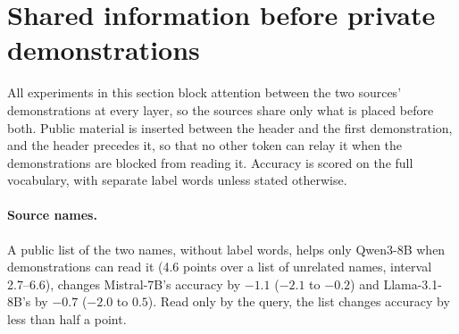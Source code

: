 \begin{table}[t]
\centering\small
\setlength{\tabcolsep}{3pt}
\caption{Controlled two-aspect reviews (shared words, both sources read by the query). With A-only reading added, accuracies are 73.8, 72.0, 86.8 and 83.3\% for selective blocking and 70.5, 70.9, 85.9 and 84.2\% for A-only reading alone.}
\label{tab:app-dual}
\end{table}

\section{Shared information before private demonstrations}
\label{app:shared}

All experiments in this section block attention between the two sources' demonstrations at every layer, so the sources share only what is placed before both.
Public material is inserted between the header and the first demonstration, and the header precedes it, so that no other token can relay it when the demonstrations are blocked from reading it.
Accuracy is scored on the full vocabulary, with separate label words unless stated otherwise.

\paragraph{Source names.}
A public list of the two names, without label words, helps only Qwen3-8B when demonstrations can read it (4.6 points over a list of unrelated names, interval 2.7--6.6), changes Mistral-7B's accuracy by $-1.1$ ($-2.1$ to $-0.2$) and Llama-3.1-8B's by $-0.7$ ($-2.0$ to $0.5$).
Read only by the query, the list changes accuracy by less than half a point.

